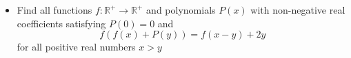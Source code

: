 \documentclass[11pt]{scrartcl}
\begin{document}
\begin{itemize}[label=,itemsep=0.4em,leftmargin=0em]
\begin{comment}
            From $(1)$ substituting $P(0,y)$, we obtain $f(-g(y)) = g(0)^2 - y$. Hence, $g$ is surjective, implying $g$ is bijective.
        \end{pro}

        Thus, there exists $c$ such that $g(c) = 0$. If $c \neq 0$, then $g(-c) = 0$, which is contradictory. Therefore, $g(0) = 0$.

        \vocab{Claim 4:} $f$ is additive.
        \begin{pro}
            From $(1)$ substituting $P(0,0)$, we get $f(0) = 0$. Substituting $P(x,0)$ gives
            \[
                f(x^2) = g(x)^2 \ra f(x^2 - g(y)) = f(x^2) - y \ra f(x - g(y)) = f(x) - y, \forall x \geq 0, y \in \mathbb{R} \tag{3}
            \]
            From $(1)$ substituting $P(0, -y)$, we have $f(g(y)) = y$. Using $(3)$ substituting $P(x, f(y))$, we obtain
            \[
                f(x - y) = f(x) - f(y) \ra f(x + y) = f(x) + f(y), \forall x,y \in \mathbb{R}
            \]
        \end{pro}

        Since $f(x^2) = g(x)^2 \ra f(x) \geq 0$ for all $x \geq 0$, by \vocab{Lemma 1}, we conclude $f(x) = ax, \forall x \in \mathbb{R}$. Testing again, we find $a = 1$ and $f(x) = x$.

        Therefore, the pair of functions that satisfy these conditions is $\boxed{f(x) = x, g(x) = x, \forall x \in \mathbb{R}}$.

    \end{comment}

    \item \begin{btvn}
        Find all functions \( f : \mathbb{R}^+ \to \mathbb{R}^+ \) and polynomials \( P(x) \) with non-negative real coefficients satisfying \( P(0) = 0 \) and \[f(f(x) + P(y)) = f(x - y) + 2y\] for all positive real numbers $x > y$
    \end{btvn}
    \begin{comment}
        

        \vocab{Claim 1:} $f(x) \geq x$.
\begin{pro}
    Suppose there exists $x_0 > 0$ such that $f(x_0) < x_0$. It's clear that the polynomial $P(y) + y$ is surjective. Hence, there exists $y_0$ such that $P(y_0) + y_0 = f(x_0) - x_0$. Substituting $P(x_0,y_0)$ gives $2x_0y_0 = 0$, which leads to contradictions in both cases. Therefore, $f(x) \geq x$.
\end{pro}


\end{comment}
\end{itemize}
\end{document}
